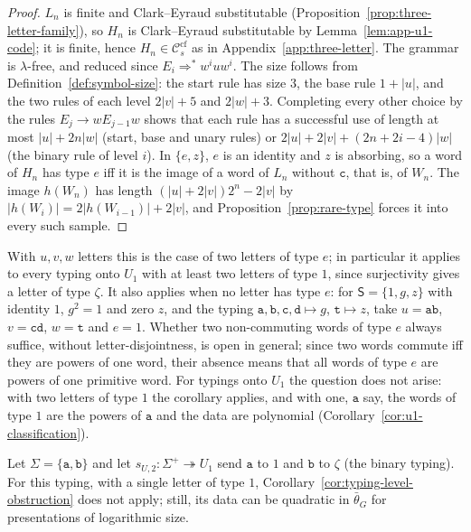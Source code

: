 \documentclass[11pt]{article}
\numberwithin{equation}{section}
\theoremstyle{plain}
\theoremstyle{definition}
\theoremstyle{remark}
\theoremstyle{plain}
\newcommand{\cf}{\mathrm{cf}}
\newcommand{\Ccf}[1]{\mathcal C_{#1}^{\cf}}
\begin{document}
\begin{proof}
$L_n$ is finite and Clark--Eyraud substitutable
(Proposition~\ref{prop:three-letter-family}), so $H_n$ is Clark--Eyraud
substitutable by Lemma~\ref{lem:app-u1-code}; it is finite, hence
$H_n\in\Ccf{s}$ as in Appendix~\ref{app:three-letter}.  The grammar is $\lambda$-free, and reduced since
$E_i\Rightarrow^*w^iuw^i$.  The size follows from
Definition~\ref{def:symbol-size}: the start rule has size $3$, the base rule
$1+|u|$, and the two rules of each level $2|v|+5$ and $2|w|+3$.  Completing every
other choice by the rules $E_j\to wE_{j-1}w$ shows that each rule has a
successful use of length at most $|u|+2n|w|$ (start, base and unary rules) or
$2|u|+2|v|+(2n+2i-4)|w|$ (the binary rule of level $i$).  In $\{e,z\}$, $e$ is an
identity and $z$ is absorbing, so a word of $H_n$ has type $e$ iff it is the
image of a word of $L_n$ without $\mathtt c$, that is, of $W_n$.  The image $h(W_n)$ has length
$(|u|+2|v|)2^n-2|v|$ by $|h(W_i)|=2|h(W_{i-1})|+2|v|$, and
Proposition~\ref{prop:rare-type} forces it into every such sample.
\end{proof}

With $u,v,w$ letters this is the case of two letters of type $e$; in
particular it applies to every typing onto $U_1$ with at least two letters of
type $1$, since surjectivity gives a letter of type $\zeta$.  It also applies
when no letter has type $e$: for $\mathsf S=\{1,g,z\}$ with identity $1$,
$g^2=1$ and zero $z$, and the typing $\mathtt a,\mathtt b,\mathtt c,\mathtt d\mapsto g$,
$\mathtt t\mapsto z$, take $u=\mathtt{ab}$, $v=\mathtt{cd}$, $w=\mathtt t$ and
$e=1$.  Whether two non-commuting words of type $e$ always suffice, without
letter-disjointness, is open in general; since two words commute iff they are
powers of one word, their absence means that all words of type $e$ are powers of
one primitive word.  For typings onto $U_1$ the question does not arise: with
two letters of type $1$ the corollary applies, and with one, $\mathtt a$ say, the
words of type $1$ are the powers of $\mathtt a$ and the data are polynomial
(Corollary~\ref{cor:u1-classification}).

Let $\Sigma=\{\mathtt a,\mathtt b\}$ and let $s_{U,2}:\Sigma^+\twoheadrightarrow U_1$ send $\mathtt a$ to
$1$ and $\mathtt b$ to $\zeta$ (the binary typing).  For this typing, with a single letter of type $1$,
Corollary~\ref{cor:typing-level-obstruction} does not apply; still, its data can
be quadratic in $\bar\theta_G$ for presentations of logarithmic size.
\end{document}
